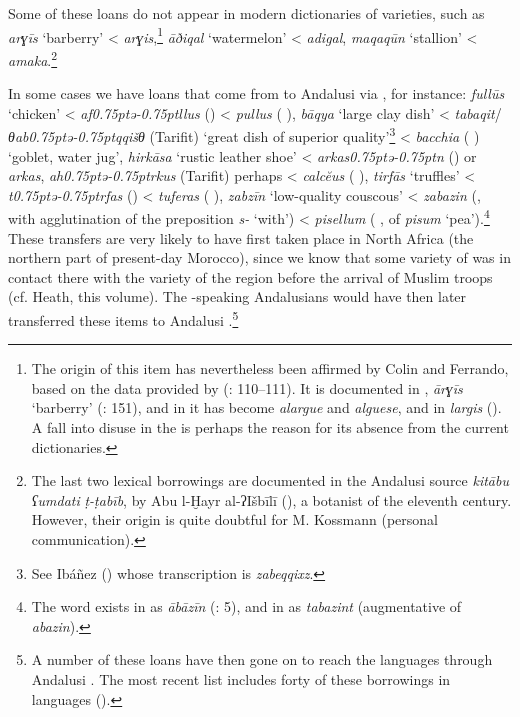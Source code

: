 \documentclass[output=paper,modfonts,nonflat]{langsci/langscibook}
\begin{document}
Some of these loans do not appear in modern dictionaries of  varieties, such as \textit{arɣīs} ‘barberry’ < \textit{arɣis},\footnote{The  origin of this item has nevertheless been affirmed by Colin and Ferrando, based on the data provided by  (\citealt{Ferrando1997}: 110–111). It is documented in  , \textit{ārɣīs} ‘barberry’ (\citealt{Prémare1995}: 151), and in  it has become \textit{alargue} and \textit{alguese}, and in  \textit{largis} (\citealt{CorrientePereiraVicenteforthcoming}). A fall into disuse in the  is perhaps the reason for its absence from the current dictionaries.} \textit{āðiqal} ‘watermelon’ < \textit{adigal}, \textit{maqaqūn} ‘stallion’ < \textit{amaka}.\footnote{The last two lexical borrowings are documented in the Andalusi source \textit{kitābu} \textit{ʕumdati} \textit{ṭ-ṭabīb}, by Abu l-Ḫayr al-ʔIšbīlī (\citeyear{Abūl-Ḫayral-Išbīlī2004,Abūl-Ḫayral-Išbīlī2007}), a botanist of the eleventh century. However, their  origin is quite doubtful for M. Kossmann (personal communication).}\largerpage

In some cases we have loans that come from   to Andalusi  via , for instance: \textit{fullūs} ‘chicken’ < \textit{af\kern 0.75ptǝ\kern -0.75ptllus} () < \textit{pullus} ( ), \textit{bāqya} ‘large clay dish’ < \textit{tabaqit}/\textit{θab\kern 0.75ptǝ\kern -0.75ptqqišθ} (Tarifit) ‘great dish of superior quality’\footnote{See Ibáñez (\citeyear[272]{Ibáñez1949}) whose transcription is \textit{zabeqqixz}.} < \textit{bacchia} ( ) ‘goblet, water jug’, \textit{hirkāsa} ‘rustic leather shoe’ < \textit{arkas\kern 0.75ptǝ\kern -0.75ptn} () or \textit{arkas}, \textit{ah\kern 0.75ptǝ\kern -0.75ptrkus} (Tarifit) perhaps < \textit{calcĕus} ( ), \textit{tirfās} ‘truffles’ < \textit{t\kern 0.75ptǝ\kern -0.75ptrfas} () < \textit{tuferas} ( ), \textit{zabzīn} ‘low-quality couscous’ < \textit{zabazin} (, {with  agglutination of the preposition} \textit{s-} ‘with’) < \textit{pisellum} ( ,  of \textit{pisum} ‘pea’).\footnote{The word exists in   as \textit{ābāzīn} (\citealt{Prémare1993}: 5), and in   as \textit{tabazint} (augmentative of \textit{abazin}).}  These transfers are very likely to have first taken place in North Africa (the northern part of present-day Morocco), since we know that some variety of   was in contact there with the  variety of the region before the arrival of Muslim troops (cf. Heath, this volume). The -speaking Andalusians would have then later transferred these items to Andalusi .\footnote{A number of these  loans have then gone on to reach the  languages through Andalusi . The most recent list includes forty of these borrowings in  languages (\citealt{CorrientePereiraVicente2019}).}  
\end{document}
